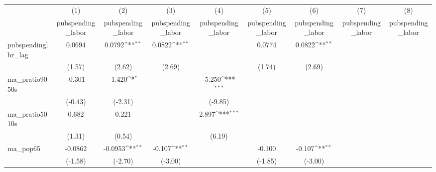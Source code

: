 {
\def\sym#1{\ifmmode^{#1}\else\(^{#1}\)\fi}
\begin{tabular}{l*{8}{c}}
\hline\hline
            &\multicolumn{1}{c}{(1)}&\multicolumn{1}{c}{(2)}&\multicolumn{1}{c}{(3)}&\multicolumn{1}{c}{(4)}&\multicolumn{1}{c}{(5)}&\multicolumn{1}{c}{(6)}&\multicolumn{1}{c}{(7)}&\multicolumn{1}{c}{(8)}\\
            &\multicolumn{1}{c}{pubspending\_labor}&\multicolumn{1}{c}{pubspending\_labor}&\multicolumn{1}{c}{pubspending\_labor}&\multicolumn{1}{c}{pubspending\_labor}&\multicolumn{1}{c}{pubspending\_labor}&\multicolumn{1}{c}{pubspending\_labor}&\multicolumn{1}{c}{pubspending\_labor}&\multicolumn{1}{c}{pubspending\_labor}\\
\hline
pubspendinglbr\_lag&      0.0694         &      0.0792\sym{**} &      0.0822\sym{**} &                     &      0.0774         &      0.0822\sym{**} &                     &                     \\
            &      (1.57)         &      (2.62)         &      (2.69)         &                     &      (1.74)         &      (2.69)         &                     &                     \\
[1em]
ma\_pratio9050s&      -0.301         &      -1.420\sym{*}  &                     &      -5.250\sym{***}&                     &                     &                     &                     \\
            &     (-0.43)         &     (-2.31)         &                     &     (-9.85)         &                     &                     &                     &                     \\
[1em]
ma\_pratio5010s&       0.682         &       0.221         &                     &       2.897\sym{***}&                     &                     &                     &                     \\
            &      (1.31)         &      (0.54)         &                     &      (6.19)         &                     &                     &                     &                     \\
[1em]
ma\_pop65    &     -0.0862         &     -0.0953\sym{**} &      -0.107\sym{**} &                     &      -0.100         &      -0.107\sym{**} &                     &                     \\
            &     (-1.58)         &     (-2.70)         &     (-3.00)         &                     &     (-1.85)         &     (-3.00)         &                     &                     \\

\end{tabular}}
